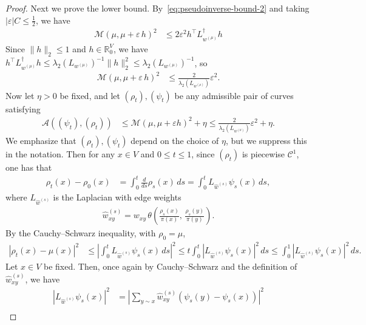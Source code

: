 \documentclass[11pt,a4paper]{article}
\newcommand{\Maas}{\mathcal{M}}
\begin{document}
\begin{proof}
    Next we prove the lower bound. By~\cref{eq:pseudoinverse-bound-2} and taking $|\varepsilon|C\le \frac12$, we have
        \begin{align*}
            \Maas(\mu, \mu+\varepsilon \, h)^2 &\leq 2\varepsilon^2 h^\top L_{w^{(\mu)}}^{\dagger} h 
        \end{align*}
    Since $\|h\|_2\le 1$ and $h\in\mathbb{R}^{V}_0$, we have $h^\top L_{w^{(\mu)}}^{\dagger} h \le \lambda_2(L_{w^{(\mu)}})^{-1}\|h\|_2^2 \le \lambda_2(L_{w^{(\mu)}})^{-1}$, so
        \begin{align*}
            \Maas(\mu, \mu+\varepsilon \, h)^2 &\leq \frac{2}{\lambda_2(L_{w^{(\mu)}})}\varepsilon^2.
        \end{align*}
    Now let $\eta > 0$ be fixed, and let $(\rho_t), (\psi_t)$ be any admissible pair of curves satisfying
        \begin{align*}
            \mathcal{A}((\psi_t), (\rho_t)) &\leq \Maas(\mu, \mu+\varepsilon h)^2 + \eta \leq \frac{2}{\lambda_2(L_{w^{(\mu)}})}\varepsilon^2 + \eta.
        \end{align*}
    We emphasize that $(\rho_t), (\psi_t)$ depend on the choice of $\eta$, but we suppress this in the notation. Then for any $x\in V$ and $0\le t\le 1$, since $(\rho_t)$ is piecewise $\mathcal{C}^1$, one has that
        \begin{align*}
            \rho_t(x) - \rho_0(x) &= \int_0^t \frac{d}{ds} \rho_s(x) \, ds = \int_0^t L_{\widehat{w}^{(s)}} \psi_s(x) \, ds,
        \end{align*}
    where $L_{\widehat{w}^{(s)}}$ is the Laplacian with edge weights
        \begin{align*}
            \widehat{w}^{(s)}_{xy} = w_{xy}\, \theta\left(\frac{\rho_s(x)}{\pi(x)}, \,\frac{\rho_s(y)}{\pi(y)}\right).
        \end{align*}
    By the Cauchy--Schwarz inequality, with $\rho_0 = \mu$,
        \begin{align}\label{eq:cauchy-schwarz-1}
            |\rho_t(x) - \mu(x)|^2 &\leq \left|\int_0^t L_{\widehat{w}^{(s)}} \psi_s(x) \, ds \right|^2 \leq t \int_0^t |L_{\widehat{w}^{(s)}} \psi_s(x)|^2 \, ds \leq \int_0^1 |L_{\widehat{w}^{(s)}} \psi_s(x)|^2 \, ds.
        \end{align}
    Let $x\in V$ be fixed. Then, once again by Cauchy--Schwarz and the definition of $\widehat{w}^{(s)}_{xy}$, we have
        \begin{align*}
            |L_{\widehat{w}^{(s)}} \psi_s(x)|^2 &= \left|\sum_{y\sim x} \widehat{w}^{(s)}_{xy} (\psi_s(y) - \psi_s(x))\right|^2 \\

\end{align*}
\end{proof}
\end{document}
